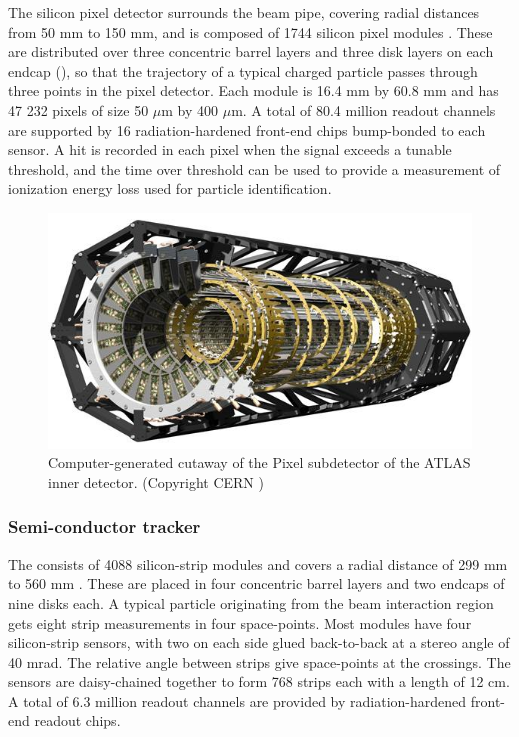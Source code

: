 The silicon pixel detector surrounds the beam pipe, covering radial distances from 50 mm to 150 mm, and is composed of 1744 silicon pixel modules \cite{Aad:2008zz}.
These are distributed over three concentric barrel layers and three disk layers on each endcap (), so that the trajectory of a typical charged particle passes through three points in the pixel detector.
Each module is 16.4 mm by 60.8 mm and has 47 232 pixels of size 50 $\mu$m by 400 $\mu$m.
A total of 80.4 million readout channels are supported by 16 radiation-hardened front-end chips bump-bonded to each sensor.
A hit is recorded in each pixel when the signal exceeds a tunable threshold, and the time over threshold can be used to provide a measurement of ionization energy loss \dEdx used for particle identification.

\begin{figure}[t]
\includegraphics{pixel.jpg}
\caption{Computer-generated cutaway of the Pixel subdetector of the ATLAS inner detector. (Copyright CERN \cite{Pequenao:1095925})}
\label{fig:atlas_pixel}
\end{figure}


\subsubsection{Semi-conductor tracker}

The \sct consists of 4088 silicon-strip modules and covers a radial distance of 299 mm to 560 mm \cite{Aad:2014mta}.
These are placed in four concentric barrel layers and two endcaps of nine disks each.
A typical particle originating from the beam interaction region gets eight strip measurements in four space-points.
Most modules have four silicon-strip sensors, with two on each side glued back-to-back at a stereo angle of 40 mrad.
The relative angle between strips give space-points at the crossings.
The sensors are daisy-chained together to form 768 strips each with a length of 12 cm.
A total of 6.3 million readout channels are provided by radiation-hardened front-end readout chips.

